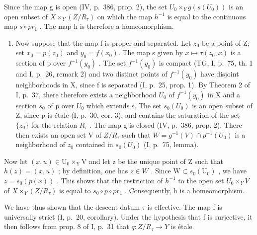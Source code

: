 Since the map g is open (IV, p.~386, prop. 2), the set \(U_{0} \times_{Y} g(s(U_{0}))\) is an open subset of \(X \times_{Y}(Z/R_{\tau})\) on which the map \(h^{-1}\) is equal to the continuous map \(s \circ pr_{1}\) . The map h is therefore a homeomorphism.

\begin{enumerate}
\def\labelenumi{\alph{enumi})}
\setcounter{enumi}{1}
\tightlist
\item
  Now suppose that the map f is proper and separated. Let \(z_{0}\) be a point of Z; set \(x_{0}=p(z_{0})\) and \(y_{0}=f(x_{0})\). The map s given by \(x\mapsto\tau(z_{0},x)\) is a section of p over \(f^{-1}(y_{0})\) . The set \(f^{-1}(y_{0})\) is compact (TG, I, p.~75, th. 1 and I, p.~26, remark 2) and two distinct points of \(f^{-1}(y_{0})\) have disjoint neighborhoods in X, since f is separated (I, p.~25, prop. 1). By Theorem 2 of I, p.~37, there therefore exists a neighborhood \(U_{0}\) of \(f^{-1}(y_{0})\) in X and a section \(s_{0}\) of p over \(U_{0}\) which extends s. The set \(s_{0}(U_{0})\) is an open subset of Z, since p is étale (I, p.~30, cor. 3), and contains the saturation of the set \(\{z_{0}\}\) for the relation \(R_{\tau}\) . The map g is closed (IV, p.~386, prop. 2). There then exists an open set V of \(Z/R_{\tau}\) such that \(W = g^{-1}(V) \cap p^{-1}(U_{0})\) is a neighborhood of \(z_{0}\) contained in \(s_{0}(U_{0})\) (I, p.~75, lemma).
\end{enumerate}

Now let \((x,u)\in\mathrm{U}_{0}\times_{\mathrm{Y}}\mathrm{V}\) and let z be the unique point of Z such that \(h(z)=(x,u)\) ; by definition, one has \(z\in W\) . Since \(\mathrm{W}\subset s_{0}(\mathrm{U}_{0})\) , we have \(z=s_{0}(p(x))\) . This shows that the restriction of \(h^{-1}\) to the open set \(U_{0}\times_{Y}V\) of \(X\times_{Y}(Z/R_{\tau})\) is equal to \(s_{0}\circ p\circ pr_{1}\) . Consequently, h is a homeomorphism.

We have thus shown that the descent datum \(\tau\) is effective. The map f is universally strict (I, p.~20, corollary). Under the hypothesis that f is surjective, it then follows from prop. 8 of I, p.~31 that \(q: Z/R_{\tau} \to Y\) is étale.

